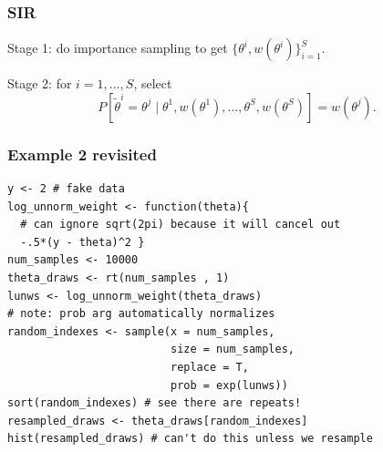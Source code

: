 \documentclass{beamer}
\begin{document}

\begin{frame}[fragile]
\frametitle{SIR}


Stage 1: do importance sampling to get $\{ \theta^i, w(\theta^i) \}_{i=1}^S$.
\newline

Stage 2: for $i = 1, \ldots, S$, select 
$$
P[ \tilde{\theta}^i = \theta^j \mid \theta^1, w(\theta^1), \ldots,
\theta^S, w(\theta^S) ] = w(\theta^j).
$$

\end{frame}







\begin{frame}[fragile]
\frametitle{Example 2 revisited}

\begin{verbatim}
y <- 2 # fake data
log_unnorm_weight <- function(theta){ 
  # can ignore sqrt(2pi) because it will cancel out
  -.5*(y - theta)^2 }
num_samples <- 10000
theta_draws <- rt(num_samples , 1)
lunws <- log_unnorm_weight(theta_draws)
# note: prob arg automatically normalizes
random_indexes <- sample(x = num_samples, 
                         size = num_samples, 
                         replace = T, 
                         prob = exp(lunws)) 
sort(random_indexes) # see there are repeats!
resampled_draws <- theta_draws[random_indexes]
hist(resampled_draws) # can't do this unless we resample
\end{verbatim}

\end{frame}
\end{document}

